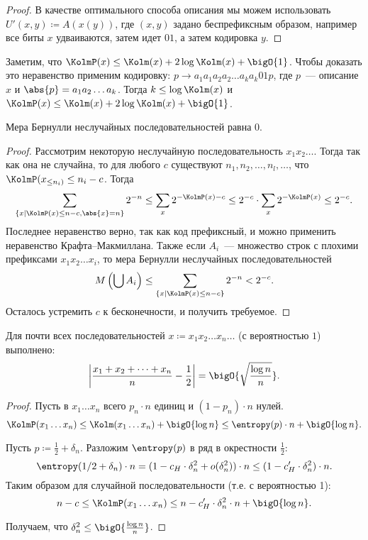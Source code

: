 \begin{proof}
    В качестве оптимального способа описания мы можем использовать $U'(x, y) \coloneqq A(x(y))$, где $(x,
    y)$ задано беспрефиксным образом, например все биты $x$ удваиваются, затем идет $01$, а затем
    кодировка $y$.
\end{proof}

Заметим, что $\KolmP(x) \le \Kolm(x) + 2 \log \Kolm(x) + \bigO{1}$. Чтобы доказать это неравенство
применим кодировку: $p \to a_1a_1a_2a_2 \ldots a_ka_k01p$, где $p$~--- описание $x$ и $\abs{p} =
a_1a_2\ldots a_k$. Тогда $k \leq \log \Kolm(x)$ и $\KolmP(x) \le \Kolm(x) + 2\log \Kolm(x) +
\bigO{1}$.

\begin{theorem}
    Мера Бернулли неслучайных последовательностей равна $0$. 
\end{theorem}

\begin{proof}
    Рассмотрим некоторую неслучайную последовательность $x_1x_2\ldots$. Тогда так как она не случайна, то
    для любого $c$ существуют $n_1,n_2, \ldots,n_l, \ldots$, что $\KolmP(x_{\leq n_i)} \leq n_i -
    c$. Тогда
    $$
        \sum\limits_{\{x \mid \KolmP(x) \le n - c, \abs{x} = n\}} 2^{-n} \leq
        \sum_x 2^{-\KolmP(x) - c} \le 2^{-c} \cdot \sum_x 2^{-\KolmP(x)} \le 2^{-c}.
    $$
    Последнее неравенство верно, так как код префиксный, и можно применить неравенство
    Крафта--Макмиллана. Также если $A_i$~--- множество строк с плохими префиксами $x_1x_2\ldots x_i$, то
    мера Бернулли неслучайных последовательностей
    $$
        M\left(\bigcup A_i\right) \leq \sum_{\{x \mid \KolmP(x) \le n - c\}} 2^{-n} < 2^{-c}.
    $$
    Осталось устремить $c$ к бесконечности, и получить требуемое.    
\end{proof}

\begin{theorem}
    Для почти всех последовательностей $x \coloneqq  x_1x_2 \dots x_n \dots$ (с вероятностью $1$)
    выполнено:
    $$
        \left|\frac{x_1 + x_2 + \dots + x_n}{n} - \frac{1}{2}\right| =
        \bigO{\sqrt{\frac{\log n}{n}}}. 
    $$
\end{theorem}

\begin{proof}
    Пусть в $x_1 \dots x_n$ всего $p_n \cdot n$ единиц и $(1 - p_n) \cdot n$ нулей.
    $$
        \KolmP(x_1 \dots x_n) \le \Kolm(x_1 \dots x_n) + \bigO{\log n} \le \entropy(p) \cdot n +
        \bigO{\log n}.
    $$

    
    Пусть $p \coloneqq \frac{1}{2} + \delta_n$. Разложим $\entropy(p)$ в ряд в окрестности $\frac{1}{2}$:
    $$ 
        \entropy(1 / 2 + \delta_n) \cdot n = (1 - c_H \cdot \delta_n^2 + o(\delta_n^2)) \cdot n \le
        (1 - c'_H \cdot \delta_n^2) \cdot n.
    $$
    Таким образом для случайной последовательности (т.е. с вероятностью 1):
    $$
        n - c \le \KolmP(x_1 \dots x_n) \le n - c'_H \cdot \delta_n^2 \cdot n + \bigO{\log n}.
    $$

    Получаем, что $\delta_n^2 \le \bigO{\frac{\log n}{n}}$.
\end{proof}
